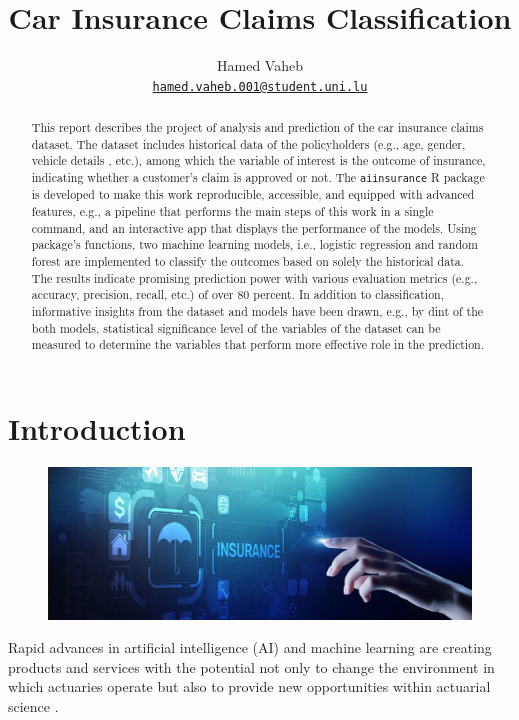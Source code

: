 \documentclass{article}
\title{\color{astral}Car Insurance Claims Classification}
\author{
    Hamed Vaheb\\
  \texttt{\href{mailto:hamed.vaheb.001@student.uni.lu}{\nolinkurl{hamed.vaheb.001@student.uni.lu}}}%
  }
\begin{document}
\maketitle


\begin{abstract}
This report describes the project of analysis and prediction of the car
insurance claims dataset. The dataset includes historical data of the
policyholders (e.g., age, gender, vehicle details , etc.), among which
the variable of interest is the outcome of insurance, indicating whether
a customer's claim is approved or not. The \texttt{aiinsurance} R
package \cite{package} is developed to make this work reproducible,
accessible, and equipped with advanced features, e.g., a pipeline that
performs the main steps of this work in a single command, and an
interactive app that displays the performance of the models. Using
package's functions, two machine learning models, i.e., logistic
regression and random forest are implemented to classify the outcomes
based on solely the historical data. The results indicate promising
prediction power with various evaluation metrics (e.g., accuracy,
precision, recall, etc.) of over 80 percent. In addition to
classification, informative insights from the dataset and models have
been drawn, e.g., by dint of the both models, statistical significance
level of the variables of the dataset can be measured to determine the
variables that perform more effective role in the prediction.
\end{abstract}


\hypertarget{introduction}{%
\section{Introduction}\label{introduction}}

\begin{figure}
\includegraphics[width=0.9\linewidth]{./figures/aiactuary.png}
\end{figure}

Rapid advances in artificial intelligence (AI) and machine learning are
creating products and services with the potential not only to change the
environment in which actuaries operate but also to provide new
opportunities within actuarial science \cite{aiinins}.
\end{document}
